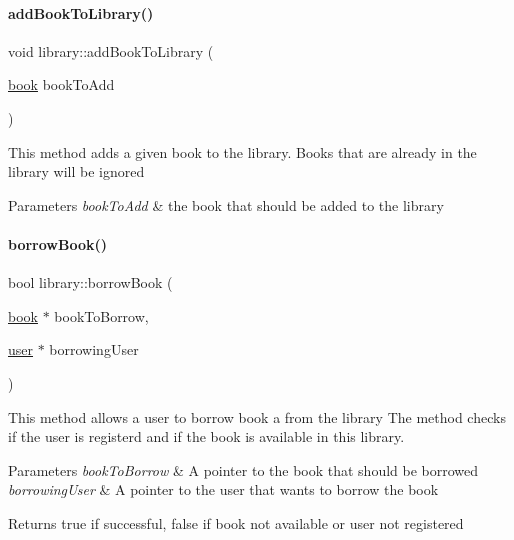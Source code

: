 \paragraph{\texorpdfstring{add\+Book\+To\+Library()}{addBookToLibrary()}}
{\footnotesize\ttfamily void library\+::add\+Book\+To\+Library (\begin{DoxyParamCaption}\item[{\hyperlink{classbook}{book}}]{book\+To\+Add }\end{DoxyParamCaption})}

This method adds a given book to the library. Books that are already in the library will be ignored


\begin{DoxyParams}{Parameters}
{\em book\+To\+Add} & the book that should be added to the library \\
\hline
\end{DoxyParams}
\mbox{\label{classlibrary_a72e06b28f9282c81bfb0760b0c07ffba}} 
\paragraph{\texorpdfstring{borrow\+Book()}{borrowBook()}}
{\footnotesize\ttfamily bool library\+::borrow\+Book (\begin{DoxyParamCaption}\item[{\hyperlink{classbook}{book} $\ast$}]{book\+To\+Borrow,  }\item[{\hyperlink{classuser}{user} $\ast$}]{borrowing\+User }\end{DoxyParamCaption})}

This method allows a user to borrow book a from the library The method checks if the user is registerd and if the book is available in this library.


\begin{DoxyParams}{Parameters}
{\em book\+To\+Borrow} & A pointer to the book that should be borrowed \\
\hline
{\em borrowing\+User} & A pointer to the user that wants to borrow the book \\
\hline
\end{DoxyParams}
\begin{DoxyReturn}{Returns}
true if successful, false if book not available or user not registered 
\end{DoxyReturn}
\mbox{\label{classlibrary_a6c04fa5207a2dc59e00882cb9aa66eb1}} 
